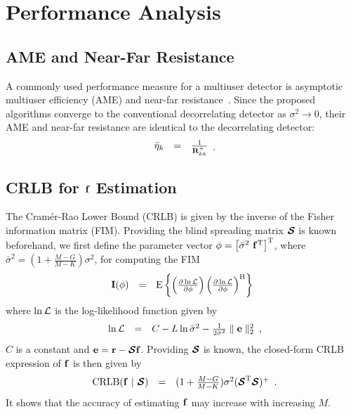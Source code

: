 \documentclass[a4paper,10pt,fleqn, twocolumn]{IEEETran}
\newcommand{\br}{{\mathbf r}}
\newcommand{\bbf}{{\bf f}}
\newcommand{\bI}{{\bf I}}
\newcommand{\bR}{{\bf R}}
\newcommand{\bcS}{{\mbox {\boldmath ${\cal S}$}}}
\begin{document}
\section{Performance Analysis}
\subsection{AME and Near-Far Resistance}
A commonly used performance measure for a multiuser detector is
asymptotic multiuser efficiency (AME) and near-far
resistance~\cite{Verd98}. Since the proposed algorithms converge
to the conventional decorrelating detector as $\sigma^2\rightarrow
0$, their AME and near-far resistance are identical to the
decorrelating detector:
\begin{equation}
\begin{array}{rcl}
\bar{\eta}_k&=&\frac{1}{\bR_{kk}^{+}}
\end{array}.
\end{equation}
\subsection{CRLB for $\bbf$ Estimation}
The Cram\'{e}r-Rao Lower Bound (CRLB) is given by the inverse of
the Fisher information matrix (FIM). Providing the blind spreading
matrix $\bcS$ is known beforehand, we first define the parameter
vector $\mathbf{\phi} = \left[\bar{\sigma}^{2}\ \bbf^{\rm
T}\right]^{\rm T}$, where $\bar{\sigma}^{2}
=(1+\frac{M-G}{M-K})\sigma^{2}$, for computing the FIM
\begin{equation}
\begin{array}{rcl}
{\bI(\mathbf{\phi})} &=& {\rm E} \left\{ \left( \frac{\partial
\ln{\cal L}}{\partial \mathbf{\phi}} \right) \left( \frac{\partial
\ln{\cal L}}{\partial \mathbf{\phi}} \right)^{\rm H} \right\}
\label{fim}
\end{array}
\end{equation}
\noindent where $\ln{\cal L}$ is the log-likelihood function given
by
\begin{equation}
\begin{array}{rcl}
\ln{\cal
L}&=&C-L\ln\bar{\sigma}^2-\frac{1}{2\bar{\sigma}^2}\parallel\mathbf{e}\parallel_2^2
\end{array},\label{logl}
\end{equation}
\noindent $C$ is a constant and $\mathbf{e}=\br-\bcS\bbf$.
Providing $\bcS$ is known, the closed-form CRLB expression of
$\bbf$ is then given by
\begin{equation}
\begin{array}{rcl}
{\rm CRLB}(\bbf\ |\ \bcS) &
=&(1+\frac{M-G}{M-K})\sigma^{2}(\bcS^{\rm T}\bcS)^{\rm +}
\end{array}.\label{CRLB_f}
\end{equation}
\noindent It shows that the accuracy of estimating $\bbf$ may
increase with increasing $M$.
\end{document}

